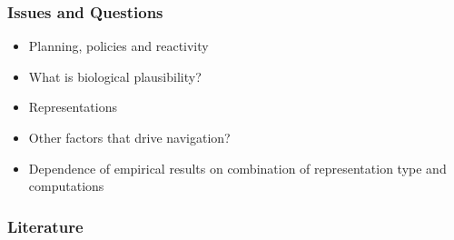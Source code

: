 \documentclass[11pt]{beamer}
\begin{document}
\begin{frame}
	\frametitle{Issues and Questions}
	\begin{itemize}
		\item Planning, policies and reactivity
		\item What is biological plausibility?
		\item Representations
		\item Other factors that drive navigation?
		\item Dependence of empirical results on combination of representation type and computations
	\end{itemize}
\end{frame}



\setlength{\bibleftmargin}{.125in}
\setlength{\bibindent}{-\bibleftmargin}

\begin{frame}
	\frametitle{Literature}
	
\end{frame}
\end{document}
